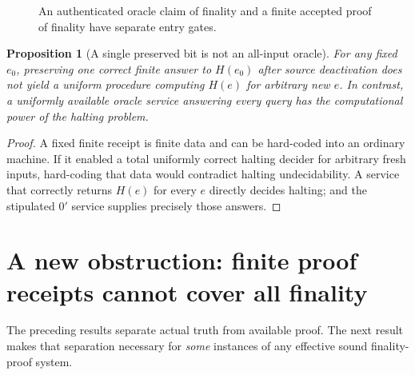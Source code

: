 \documentclass[11pt,letterpaper]{article}
\newtheorem{proposition}[theorem]{Proposition}
\theoremstyle{definition}
\theoremstyle{remark}
\newcommand{\Fin}{\mathsf{Final}}
\newcommand{\Cert}{\mathsf{Cert}}
\newcommand{\Att}{\mathsf{Att}}
\newcommand{\Auth}{\mathsf{Auth}}
\begin{document}
\begin{figure}[htbp]
\centering
{}
\caption{An authenticated oracle claim of finality and a finite accepted proof of finality have separate entry gates.}
\end{figure}

\begin{proposition}[A single preserved bit is not an all-input oracle]
For any fixed $e_0$, preserving one correct finite answer to $H(e_0)$ after source deactivation does not yield a uniform procedure computing $H(e)$ for arbitrary new $e$. In contrast, a uniformly available oracle service answering every query has the computational power of the halting problem.
\end{proposition}
\begin{proof}
A fixed finite receipt is finite data and can be hard-coded into an ordinary machine. If it enabled a total uniformly correct halting decider for arbitrary fresh inputs, hard-coding that data would contradict halting undecidability. A service that correctly returns $H(e)$ for every $e$ directly decides halting; and the stipulated $0'$ service supplies precisely those answers.
\end{proof}

\section{A new obstruction: finite proof receipts cannot cover all finality}
The preceding results separate actual truth from available proof. The next result makes that separation necessary for \emph{some} instances of any effective sound finality-proof system.
\end{document}
